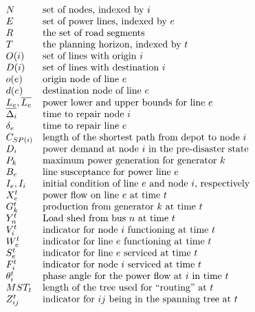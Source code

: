 \documentclass{article}
\begin{document}
	\begin{displaymath}
	\begin{array}{llll}
	N & \mbox{set of nodes, indexed by $i$} \\
	E & \mbox{set of power lines, indexed by $e$}\\
	R & \mbox{the set of road segments} \\
	T & \mbox{the planning horizon, indexed by $t$}  \\
	O(i) & \mbox{set of lines with origin $i$} \\
	D(i) & \mbox{set of lines with destination $i$} \\
	o(e) & \mbox{origin node of line $e$} \\
	d(e) & \mbox{destination node of line $e$} \\
	\underline{L_e},\overline{L_e} & \mbox{power lower and upper bounds for line $e$}\\
	\Delta_{i} & \mbox{time to repair node $i$} \\
	\delta_{e} & \mbox{time to repair line $e$}\\
	C_{SP(i)} & \mbox{length of the shortest path from depot to node $i$}\\
	D_i & \mbox{power demand at node $i$ in the pre-disaster state}\\
	P_k & \mbox{maximum power generation for generator $k$}\\
	B_e&  \mbox{line susceptance for power line $e$}\\
	I_e, I_i & \mbox{initial condition of line $e$ and node $i$, respectively}\\
	X_{e}^{t} & \mbox{power flow on line $e$ at time $t$}\\
	G_{k}^t & \mbox{production from generator $k$ at time $t$}\\
	Y_{n}^t & \mbox{Load shed from bus $n$ at time $t$}\\ 
	V_i^t & \mbox{indicator for node $i$ functioning at time $t$}\\
	W_{e}^t & \mbox{indicator for line $e$ functioning at time $t$}\\
	S_{e}^t & \mbox{indicator for line $e$ serviced at time $t$}\\
	F_i^t & \mbox{indicator for node $i$ serviced at time $t$}\\
	\theta_i^t & \mbox{phase angle for the power flow at $i$ in time $t$}\\
	MST_t & \mbox{length of the tree used for ``routing'' at $t$} \\
	Z_{ij}^t & \mbox{indicator for $ij$ being in the spanning tree at $t$}
	
	\end{array}
	\normalsize
	\end{displaymath}
\end{document}
